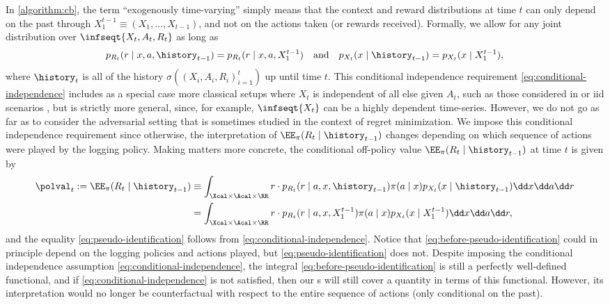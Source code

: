 In \cref{algorithm:cb}, the term ``exogenously time-varying'' simply means that the context and reward distributions at time $t$ can only depend on the past through $X_1^{t-1}  \equiv (X_1, \dots, X_{t-1})$, and not on the actions taken (or rewards received). Formally, we allow for any joint distribution over $\infseqt{X_t, A_t, R_t}$ as long as 
\begin{equation}\label{eq:conditional-independence}
    p_{R_t}(r \mid x, a, \history_{t-1}) = p_{R_t}(r \mid x, a, X_1^{t-1})~~~\text{and}~~~p_{X_t}(x \mid \history_{t-1}) = p_{X_t}(x \mid X_1^{t-1}),
\end{equation}
where $\history_t$ is all of the history $\sigma\left ((X_i, A_i, R_i)_{i=1}^t \right )$ up until time $t$. This conditional independence requirement \eqref{eq:conditional-independence} includes as a special case more classical setups where $X_t$ is independent of all else given $A_t$, such as those considered in \citet{bibaut2021post} or iid scenarios \citep{karampatziakis2021off}, but is strictly more general, since, for example, $\infseqt{X_t}$ can be a highly dependent time-series. However, we do not go as far as to consider the adversarial setting that is sometimes studied in the context of regret minimization. We impose this conditional independence requirement since otherwise, the interpretation of $\EE_{\pi}(R_t \mid \history_{t-1})$ changes depending on which sequence of actions were played by the logging policy. Making matters more concrete, the conditional off-policy value $\EE_\pi(R_t \mid \history_{t-1})$ at time $t$ is given by
\begin{align}
    \polval_t := \EE_{\pi} (R_t \mid \history_{t-1}) &\equiv \int_{\Xcal \times \Acal \times \RR} r\cdot p_{R_t}(r \mid a, x, \history_{t-1}) \pi(a \mid x) p_{X_t}(x \mid \history_{t-1}) \dd x \dd a \dd r \label{eq:before-pseudo-identification}\\
    &=\int_{\Xcal \times \Acal \times \RR} r\cdot p_{R_t}(r \mid a, x, X_1^{t-1}) \pi(a \mid x) p_{X_t}(x \mid X_1^{t-1}) \dd x \dd a \dd r,\label{eq:pseudo-identification}
\end{align}
and the equality \eqref{eq:pseudo-identification} follows from \eqref{eq:conditional-independence}. Notice that \eqref{eq:before-pseudo-identification} could in principle depend on the logging policies and actions played, but \eqref{eq:pseudo-identification} does not. Despite imposing the conditional independence assumption \eqref{eq:conditional-independence}, the integral \eqref{eq:before-pseudo-identification} is still a perfectly well-defined functional, and if \eqref{eq:conditional-independence} is not satisfied, then our \cs{}s will still cover a quantity in terms of this functional. However, its interpretation would no longer be counterfactual with respect to the entire sequence of actions (only conditional on the past).

